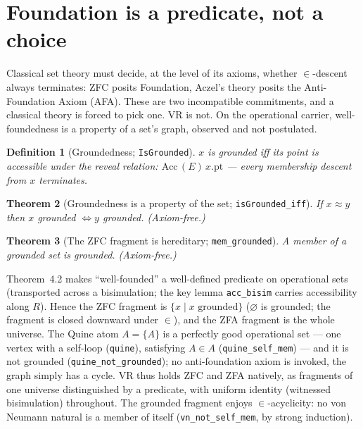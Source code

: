 \documentclass[11pt]{article}
\newtheorem{thm}{Theorem}[section]
\newtheorem{defn}[thm]{Definition}
\theoremstyle{remark}
\newcommand{\eq}{\approx}
\begin{document}
\section{Foundation is a predicate, not a choice}
Classical set theory must decide, at the level of its axioms, whether $\in$-descent always
terminates: ZFC posits Foundation, Aczel's theory posits the Anti-Foundation Axiom (AFA). These are
two incompatible commitments, and a classical theory is forced to pick one. VR is not. On the
operational carrier, well-foundedness is a property of a set's graph, observed and not postulated.
\begin{defn}[Groundedness; \texttt{IsGrounded}]
$x$ is grounded iff its point is accessible under the reveal relation: $\mathrm{Acc}\,(E)\,
x.\mathrm{pt}$ --- every membership descent from $x$ terminates.
\end{defn}
\begin{thm}[Groundedness is a property of the set; \texttt{isGrounded\_iff}]
If $x\eq y$ then $x$ grounded $\iff y$ grounded. (Axiom-free.)
\end{thm}
\begin{thm}[The ZFC fragment is hereditary; \texttt{mem\_grounded}]
A member of a grounded set is grounded. (Axiom-free.)
\end{thm}
Theorem~4.2 makes ``well-founded'' a well-defined predicate on operational sets (transported across
a bisimulation; the key lemma \texttt{acc\_bisim} carries accessibility along $R$). Hence the ZFC
fragment is $\{x\mid x\text{ grounded}\}$ ($\varnothing$ is grounded; the fragment is closed downward
under $\in$), and the ZFA fragment is the whole universe. The Quine atom $A=\{A\}$ is a perfectly
good operational set --- one vertex with a self-loop (\texttt{quine}), satisfying $A\in A$
(\texttt{quine\_self\_mem}) --- and it is not grounded (\texttt{quine\_not\_grounded}); no
anti-foundation axiom is invoked, the graph simply has a cycle. VR thus holds ZFC and ZFA natively,
as fragments of one universe distinguished by a predicate, with uniform identity (witnessed
bisimulation) throughout. The grounded fragment enjoys $\in$-acyclicity: no von Neumann natural is a
member of itself (\texttt{vn\_not\_self\_mem}, by strong induction).
\end{document}
